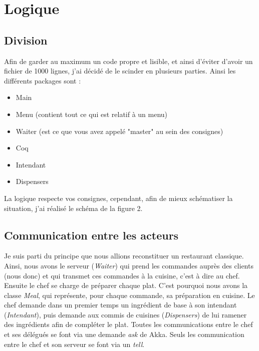 \section{Logique}
\subsection{Division}
Afin de garder au maximum un code propre et lisible, 
et ainsi d'éviter d'avoir un fichier de 1000 lignes, 
j'ai décidé de le scinder en plusieurs parties. 
Ainsi les différents packages sont : 
\begin{itemize}
    \item Main 
    \item Menu (contient tout ce qui est relatif à un menu)
    \item Waiter (est ce que vous avez appelé "master" au sein des consignes)
    \item Coq 
    \item Intendant 
    \item Dispensers 
\end{itemize}

La logique respecte vos consignes, cependant, 
afin de mieux schématiser la situation, j'ai réalisé le schéma de la figure 2.

\subsection{Communication entre les acteurs}
Je suis parti du principe que nous allions reconstituer un restaurant classique.
Ainsi, nous avons le serveur (\textit{Waiter}) qui prend les commandes auprès des clients 
(nous donc) et qui transmet ces commandes à la cuisine, c'est à dire au chef. 
Ensuite le chef se charge de préparer chaque plat. C'est pourquoi nous avons la classe
\textit{Meal}, qui représente, pour chaque commande, sa préparation en cuisine. 
Le chef demande dans un premier temps un ingrédient de base à son intendant (\textit{Intendant}), 
puis demande aux commis de cuisines (\textit{Dispensers}) de lui ramener des ingrédients 
afin de compléter le plat. Toutes les communications entre le chef et ses délégués se font via une 
demande \textit{ask} de Akka. Seuls les communication entre le chef et son serveur se font via 
un \textit{tell}. 

